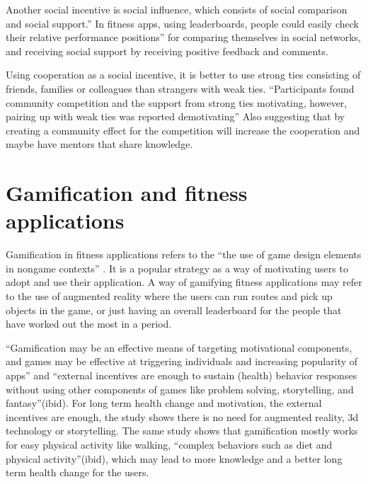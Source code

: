 Another social incentive is social influence, which consists of social comparison and social support.” In fitness apps, using leaderboards, people could easily check their relative performance positions”\cite{Zhou2018} for comparing themselves in social networks, and receiving social support by receiving positive feedback and comments.

Using cooperation as a social incentive, it is better to use strong ties consisting of friends, families or colleagues than strangers with weak ties. “Participants found community competition and the support from strong ties motivating, however, pairing up with weak ties was reported demotivating”\cite{Chen2016} Also suggesting that by creating a community effect for the competition will increase the cooperation and maybe have mentors that share knowledge.

\section{Gamification and fitness applications}
Gamification in fitness applications refers to the “the use of game design elements in nongame contexts” \cite{Deterding}. It is a popular strategy as a way of motivating users to adopt and use their application. A way of gamifying fitness applications may refer to the use of augmented reality where the users can run routes and pick up objects in the game, or just having an overall leaderboard for the people that have worked out the most in a period.

 “Gamification may be an effective means of targeting motivational components, and games may be effective at triggering individuals and increasing popularity of apps”\cite{Lister} and “external incentives are enough to sustain (health) behavior responses without using other components of games like problem solving, storytelling, and fantasy”(ibid).  For long term health change and motivation, the external incentives are enough, the study shows there is no need for augmented reality, 3d technology or storytelling.  The same study shows that gamification mostly works for easy physical activity like walking, “complex behaviors such as diet and physical activity”(ibid), which may lead to more knowledge and a better long term health change for the users.

